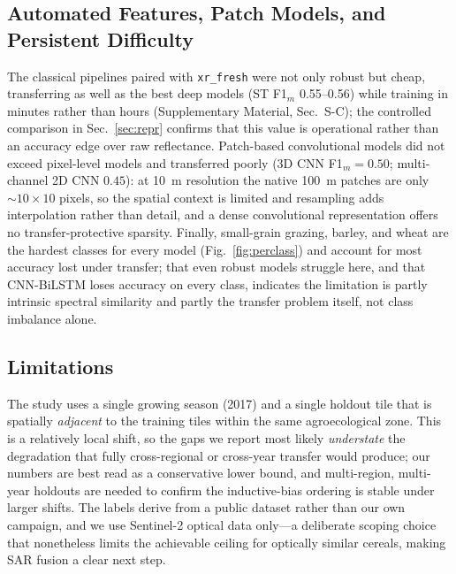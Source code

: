 \documentclass[preprint,authoryear]{elsarticle}
\begin{document}
\subsection{Automated Features, Patch Models, and Persistent Difficulty}
The classical pipelines paired with \texttt{xr\_fresh} were not only robust but cheap, transferring as well as the best deep models (ST F1$_m$ 0.55--0.56) while training in minutes rather than hours (Supplementary Material, Sec.~S-C); the controlled comparison in Sec.~\ref{sec:repr} confirms that this value is operational rather than an accuracy edge over raw reflectance. Patch-based convolutional models did not exceed pixel-level models and transferred poorly (3D CNN F1$_m=0.50$; multi-channel 2D CNN $0.45$): at 10~m resolution the native 100~m patches are only ${\sim}10\times10$ pixels, so the spatial context is limited and resampling adds interpolation rather than detail, and a dense convolutional representation offers no transfer-protective sparsity. Finally, small-grain grazing, barley, and wheat are the hardest classes for every model (Fig.~\ref{fig:perclass}) and account for most accuracy lost under transfer; that even robust models struggle here, and that CNN-BiLSTM loses accuracy on every class, indicates the limitation is partly intrinsic spectral similarity and partly the transfer problem itself, not class imbalance alone.

\subsection{Limitations}
The study uses a single growing season (2017) and a single holdout tile that is spatially \emph{adjacent} to the training tiles within the same agroecological zone. This is a relatively local shift, so the gaps we report most likely \emph{understate} the degradation that fully cross-regional or cross-year transfer would produce; our numbers are best read as a conservative lower bound, and multi-region, multi-year holdouts are needed to confirm the inductive-bias ordering is stable under larger shifts. The labels derive from a public dataset rather than our own campaign, and we use Sentinel-2 optical data only---a deliberate scoping choice that nonetheless limits the achievable ceiling for optically similar cereals, making SAR fusion a clear next step.
\end{document}
